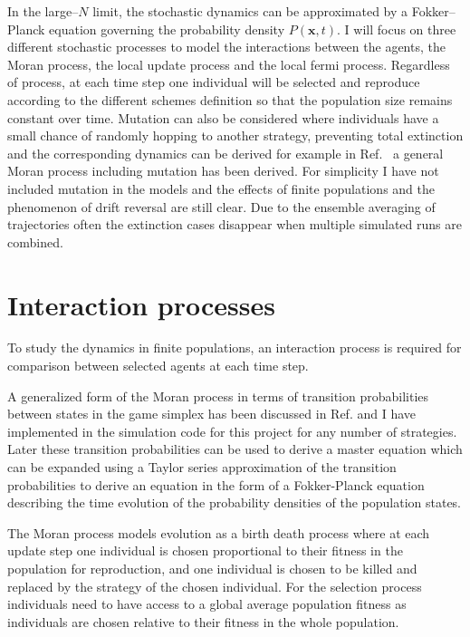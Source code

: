 \documentclass[%
 reprint,
 amsmath,amssymb,
 aps,
]{revtex4-2}
\begin{document}
In the large--$N$ limit, the stochastic dynamics can be
 approximated by a Fokker--Planck equation governing the 
 probability density $P(\mathbf{x},t)$. 
I will focus on three different stochastic processes to 
model the interactions between the agents, the Moran process,
the local update process and the local fermi process.
Regardless of process, at each time step one individual will 
be selected and reproduce according to the different schemes definition
so that the population size remains constant over time.
Mutation can also be considered where individuals have a 
small chance of randomly hopping to another strategy, preventing 
total extinction and the corresponding dynamics 
can be derived for example in Ref.~\cite{general_moran_process} 
a general Moran process
including mutation has been derived.
For simplicity I have not included mutation in the models 
and the effects of finite populations and the phenomenon of 
drift reversal are still clear. Due to the 
ensemble averaging of trajectories often the extinction cases
disappear when multiple simulated runs are combined.



\section{\label{sec:interaction_processes}Interaction processes}

To study the dynamics in finite populations, an interaction process is required for 
comparison between selected agents at each time step.

A generalized form of the Moran process in terms of transition probabilities between states in the 
game simplex has been discussed in Ref.\cite{general_moran_process} and I have implemented in the
simulation code for this project for any number of strategies. Later these transition probabilities can be used to derive a master equation \cite{alma9933506044604871} which 
can be expanded using a Taylor series approximation of the transition probabilities to derive an equation in the form of a Fokker-Planck equation
describing the time evolution of the probability densities of the population states.

The Moran process models evolution as a birth death process where at each update step
one individual is chosen proportional to their fitness in the population for 
reproduction, and one individual is chosen to be killed and replaced by the
strategy of the chosen individual. For the selection process individuals need to have
access to a global average population fitness as individuals are chosen 
relative to their fitness in the whole population. 
\end{document}
